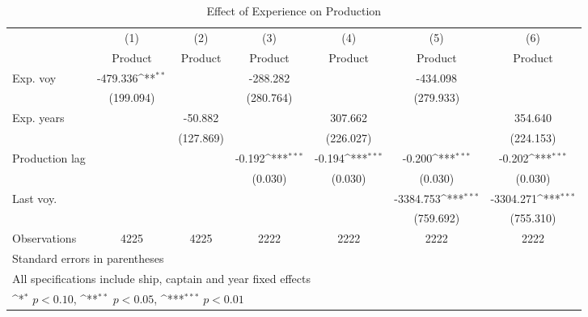 \begin{table}[htbp]\centering
\def\sym#1{\ifmmode^{#1}\else\(^{#1}\)\fi}
\caption{Effect of Experience on Production}
\begin{tabular}{l*{6}{c}}
\hline\hline
                    &\multicolumn{1}{c}{(1)}&\multicolumn{1}{c}{(2)}&\multicolumn{1}{c}{(3)}&\multicolumn{1}{c}{(4)}&\multicolumn{1}{c}{(5)}&\multicolumn{1}{c}{(6)}\\
                    &\multicolumn{1}{c}{Product}&\multicolumn{1}{c}{Product}&\multicolumn{1}{c}{Product}&\multicolumn{1}{c}{Product}&\multicolumn{1}{c}{Product}&\multicolumn{1}{c}{Product}\\
\hline
Exp. voy            &    -479.336\sym{**} &                     &    -288.282         &                     &    -434.098         &                     \\
                    &   (199.094)         &                     &   (280.764)         &                     &   (279.933)         &                     \\
Exp. years          &                     &     -50.882         &                     &     307.662         &                     &     354.640         \\
                    &                     &   (127.869)         &                     &   (226.027)         &                     &   (224.153)         \\
Production lag      &                     &                     &      -0.192\sym{***}&      -0.194\sym{***}&      -0.200\sym{***}&      -0.202\sym{***}\\
                    &                     &                     &     (0.030)         &     (0.030)         &     (0.030)         &     (0.030)         \\
Last voy.           &                     &                     &                     &                     &   -3384.753\sym{***}&   -3304.271\sym{***}\\
                    &                     &                     &                     &                     &   (759.692)         &   (755.310)         \\
\hline
Observations        &        4225         &        4225         &        2222         &        2222         &        2222         &        2222         \\
\hline\hline
\multicolumn{7}{l}{\footnotesize Standard errors in parentheses}\\
\multicolumn{7}{l}{\footnotesize All specifications include ship, captain and year fixed effects}\\
\multicolumn{7}{l}{\footnotesize \sym{*} \(p<0.10\), \sym{**} \(p<0.05\), \sym{***} \(p<0.01\)}\\
\end{tabular}
\end{table}
